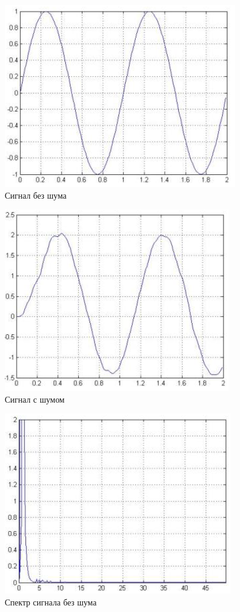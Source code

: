 \documentclass[a4paper, 12pt]{article}
\begin{document}
\begin{figure}[H]
   \includegraphics[scale=0.7]{lab6/1.png}
   \caption{Сигнал без шума}
\end{figure}

\begin{figure}[H]
   \includegraphics[scale=0.7]{lab6/2.png}
   \caption{Сигнал с шумом}
\end{figure}

\begin{figure}[H]
   \includegraphics[scale=0.7]{lab6/3.png}
   \caption{Спектр сигнала без шума}
\end{figure}
\end{document}
